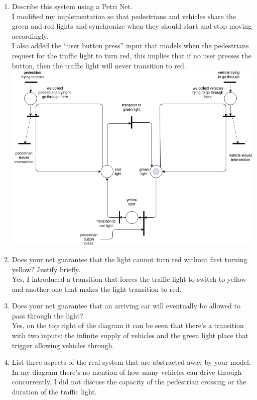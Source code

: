 \documentclass{article}
\begin{document}
\begin{enumerate}
    \begin{enumerate}
    \item Describe this system using a Petri Net. \\
      I modified my implementation so that pedestrians and vehicles share the green and red lights and synchronize when they should start and stop moving accordingly.\\
I also added the ``user button press'' input that models when the pedestrians request for the traffic light to turn red, this implies that if no user presses the button, then the traffic light will never transition to red.
      \\
       \includegraphics[scale=0.5]{hw13p2.png} \\
     \item Does your net guarantee that the light cannot turn red without first turning yellow? Justify briefly. \\
       Yes, I introduced a transition that forces the traffic light to switch to yellow and another one that makes the light transition to red. \\
  \item Does your net guarantee that an arriving car will eventually be allowed to pass through the light? \\
    Yes, on the top right of the diagram it can be seen that there's a transition with two inputs: the infinite supply of vehicles and the green light place that trigger allowing vehicles through. \\
  \item List three aspects of the real system that are abstracted away by your model. \\
    In my diagram there's no mention of how many vehicles can drive through concurrently, I did not discuss the capacity of the pedestrian crossing or the duration of the traffic light. \\
    \end{enumerate}



\end{enumerate}
\end{document}
